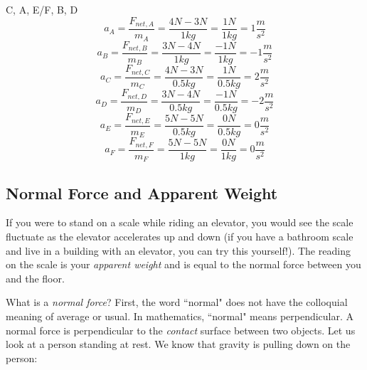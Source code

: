\begin{Answer}[ref = netF]
C, A, E/F, B, D
$$a_A = \frac{F_{net, A}}{m_A} = \frac{4N - 3N}{1kg} = \frac{1N}{1kg} = 1 
\frac{m}{s^2}$$
$$a_B = \frac{F_{net, B}}{m_B} = \frac{3N - 4N}{1kg} = \frac{-1N}{1kg} = -1 
\frac{m}{s^2}$$
$$a_C = \frac{F_{net, C}}{m_C} = \frac{4N - 3N}{0.5kg} = \frac{1N}{0.5kg} = 2 
\frac{m}{s^2}$$
$$a_D = \frac{F_{net, D}}{m_D} = \frac{3N - 4N}{0.5kg} = \frac{-1N}{0.5kg} = -2 
\frac{m}{s^2}$$
$$a_E = \frac{F_{net, E}}{m_E} = \frac{5N - 5N}{0.5kg} = \frac{0N}{0.5kg} = 0 
\frac{m}{s^2}$$
$$a_F = \frac{F_{net, F}}{m_F} = \frac{5N - 5N}{1kg} = \frac{0N}{1kg} = 0 
\frac{m}{s^2}$$
\end{Answer}

\subsection{Normal Force and Apparent Weight}
If you were to stand on a scale while riding an elevator, you would see the scale 
fluctuate as the elevator accelerates up and down (if you have a bathroom scale 
and live in a building with an elevator, you can try this yourself!). The reading 
on the scale is your \textit{apparent weight} and is equal to the normal force 
between you and the floor. 

What is a \textit{normal force}? First, the word ``normal" does not have the 
colloquial meaning of average or usual. In mathematics, ``normal" means 
perpendicular. A normal force is perpendicular to the \emph{contact} surface between 
two objects. Let us look at a person standing at rest. We know that gravity is 
pulling down on the person:

